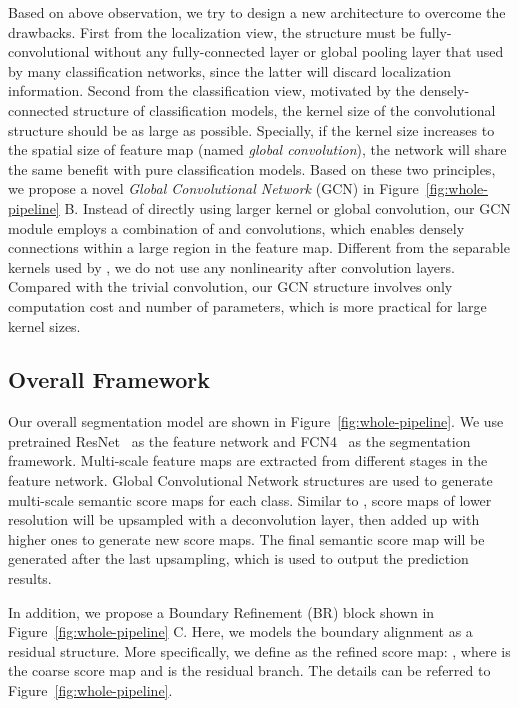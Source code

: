 \documentclass[10pt,twocolumn,letterpaper]{article}
\begin{document}
   Based on above observation, we try to design a new architecture to overcome the drawbacks. First from the localization view, the structure must be fully-convolutional without any fully-connected layer or global pooling layer that used by many classification networks, since the latter will discard localization information. Second from the classification view, motivated by the densely-connected structure of classification models, the kernel size of the convolutional structure should be as large as possible. Specially, if the kernel size increases to the spatial size of feature map (named \emph{global convolution}), the network will share the same benefit with pure classification models. Based on these two principles, we propose a novel \emph{Global Convolutional Network} (GCN) in Figure~\ref{fig:whole-pipeline} B. Instead of directly using larger kernel or global convolution, our GCN module employs a combination of  and  convolutions, which enables densely connections within a large  region in the feature map. Different from the separable kernels used by \cite{szegedy2015rethinking}, we do not use any nonlinearity after convolution layers. Compared with the trivial  convolution, our GCN structure involves only  computation cost and number of parameters, which is more practical for large kernel sizes.
   
\subsection{Overall Framework}
\label{sec:network-design}
	Our overall segmentation model are shown in Figure~\ref{fig:whole-pipeline}. We use pretrained ResNet~\cite{He_2016_CVPR} as the feature network and FCN4~\cite{long2015fully,xie2015holistically} as the segmentation framework. Multi-scale feature maps are extracted from different stages in the feature network. Global Convolutional Network structures are used to generate multi-scale semantic score maps for each class. Similar to \cite{long2015fully,xie2015holistically}, score maps of lower resolution will be upsampled with a deconvolution layer, then added up with higher ones to generate new score maps. The final semantic score map will be generated after the last upsampling, which is used to output the prediction results.
\par
   In addition, we propose a Boundary Refinement (BR) block shown in Figure~\ref{fig:whole-pipeline} C. Here, we models the boundary alignment as a residual structure. More specifically, we define  as the refined score map: , where  is the coarse score map and  is the residual branch. The details can be referred to Figure~\ref{fig:whole-pipeline}. 
\end{document}
